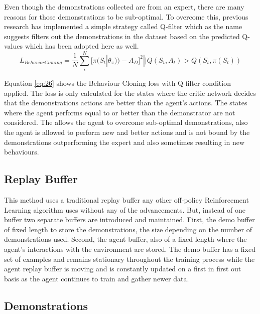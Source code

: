 Even though the demonstrations collected are from an expert, there are many reasons for those demonstrations to be sub-optimal. To overcome this, previous research has implemented a simple strategy called Q-filter which as the name suggests filters out the demonstrations in the dataset based on the predicted Q-values which has been adopted here as well. \\

\begin{equation}\label{eq:26}
    L_{BehaviorCloning} = \frac{1}{N} \sum_{i}^{N} [\pi(S_{t} | \theta_\pi )) - A_D ]^2 || Q(S_t, A_t) > Q(S_t, \pi (S_t ))
\end{equation}

Equation \ref{eq:26} shows the Behaviour Cloning loss with Q-filter condition applied. The loss is only calculated for the states where the critic network decides that the demonstrations actions are better than the agent's actions. The states where the agent performs equal to or better than the demonstrator are not considered. The allows the agent to overcome sub-optimal demonstrations, also the agent is allowed to perform new and better actions and is not bound by the demonstrations outperforming the expert and also sometimes resulting in new behaviours. \\

\subsection{Replay Buffer}

This method uses a traditional replay buffer any other off-policy Reinforcement Learning algorithm uses without any of the advancements. But, instead of one buffer two separate buffers are introduced and maintained. First, the demo buffer of fixed length to store the demonstrations, the size depending on the number of demonstrations used. Second, the agent buffer, also of a fixed length where the agent's interactions with the environment are stored. The demo buffer has a fixed set of examples and remains stationary throughout the training process while the agent replay buffer is moving and is constantly updated on a first in first out basis as the agent continues to train and gather newer data. \\

\subsection{Demonstrations}

